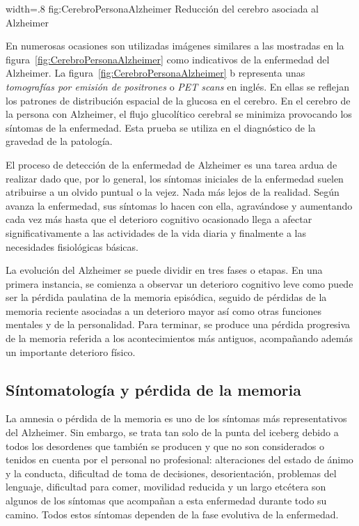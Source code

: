 %
{width=.8\textwidth}%
{fig:CerebroPersonaAlzheimer}%
{Reducción del cerebro asociada al Alzheimer \citep{mattson2004pathways}}

En numerosas ocasiones son utilizadas imágenes similares a las mostradas en la figura~\ref{fig:CerebroPersonaAlzheimer} como indicativos de la enfermedad del Alzheimer. La figura~\ref{fig:CerebroPersonaAlzheimer} b  representa unas \textit{tomografías por emisión de positrones} o \textit{PET scans} en inglés. En ellas se reflejan los patrones de distribución espacial de la glucosa en el cerebro. En el cerebro de la persona con Alzheimer, el flujo glucolítico cerebral se minimiza provocando los síntomas de la enfermedad. Esta prueba se utiliza en el diagnóstico de la gravedad de la patología.


El proceso de detección de la enfermedad de Alzheimer es una tarea ardua de realizar dado que, por lo general, los síntomas iniciales de la enfermedad suelen atribuirse a un olvido puntual o la vejez. Nada más lejos de la realidad. Según avanza la enfermedad, sus síntomas lo hacen con ella, agravándose y aumentando cada vez más hasta que el deterioro cognitivo ocasionado llega a afectar significativamente a las actividades de la vida diaria y finalmente a las necesidades fisiológicas básicas.

La evolución del Alzheimer se puede dividir en tres fases o etapas. En una primera instancia, se comienza a observar un deterioro cognitivo leve como puede ser la pérdida paulatina de la memoria episódica, seguido de pérdidas de la memoria reciente asociadas a un deterioro mayor así como otras funciones mentales y de la personalidad. Para terminar, se produce una pérdida progresiva de la memoria referida a los acontecimientos más antiguos, acompañando además un importante deterioro físico.


\subsection{Síntomatología y pérdida de la memoria}
La amnesia o pérdida de la memoria es uno de los síntomas más representativos del Alzheimer. Sin embargo, se trata tan solo de la punta del iceberg debido a todos los desordenes que también se producen y que no son considerados o tenidos en cuenta por el personal no profesional: alteraciones del estado de ánimo y la conducta, dificultad de toma de decisiones, desorientación, problemas del lenguaje, dificultad para comer, movilidad reducida  y un largo etcétera son algunos de los síntomas que acompañan a esta enfermedad durante todo su camino. Todos estos síntomas dependen de la fase evolutiva de la enfermedad.

